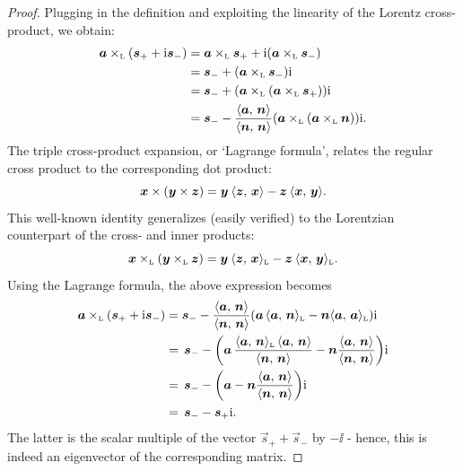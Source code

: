 \begin{proof}
    Plugging in the definition and exploiting the linearity of the Lorentz cross-product, we obtain:
    \begin{equation*}
        \begin{split}
            \lorcrossp{\vec{a}}{\qty(\vec{s}_+ + \ii\vec{s}_-)} 
            &= \lorcrossp{\vec{a}}{\vec{s}_+} +
        \ii\qty(\lorcrossp{\vec{a}}{\vec{s}_-}) \\
            &= \vec{s}_- + \qty(\lorcrossp{\vec{a}}{\vec{s}_-})\ii \\ 
            &=\vec{s}_- +  \qty(\lorcrossp{\vec{a}}{\qty(\lorcrossp{\vec{a}}{\vec{s}_+})})\ii \\
            &=\vec{s}_- -  \frac{ \inner{\vec{a}}{\vec{n}}}{ \inner{\vec{n}}{\vec{n}} }\qty(\lorcrossp{\vec{a}}{\qty(\lorcrossp{\vec{a}}{\vec{n}})})\ii.  \\
        \end{split}
    \end{equation*}
The triple cross-product expansion, or `Lagrange formula', relates the regular cross product to the corresponding dot product:
    $$ \vec{x}\times\qty(\vec{y}\times\vec{z}) = \vec{y}\:\inner{\vec{z}}{\vec{x}} - \vec{z}\:\inner{\vec{x}}{\vec{y}}. $$
This well-known identity generalizes (easily verified) to the Lorentzian counterpart of the cross- and inner products:
$$ 
    \lorcrossp{\vec{x}}{\qty(\lorcrossp{\vec{y}}{\vec{z}})} 
   = \vec{y}\:\lorinner{\vec{z}}{\vec{x}} - \vec{z}\:\lorinner{\vec{x}}{\vec{y}}. 
$$
Using the Lagrange formula, the above expression becomes
    \begin{equation*}
        \begin{split}
            \lorcrossp{\vec{a}}{\qty(\vec{s}_+ + \ii\vec{s}_-)} &= 
                \vec{s}_- - \frac{ \inner{\vec{a}}{\vec{n}} }{ \inner{\vec{n}}{\vec{n}} }\qty(\vec{a}\,\lorinner{\vec{a}}{\vec{n}} - \vec{n}\lorinner{\vec{a}}{\vec{a}})\ii \\
                & =\, \vec{s}_- - \qty(\vec{a}\,\frac{ \lorinner{\vec{a}}{\vec{n}} \, \inner{\vec{a}}{\vec{n}} }{ \inner{\vec{n}}{\vec{n}} } - \vec{n}\frac{ \inner{\vec{a}}{\vec{n}} }{ \inner{\vec{n}}{\vec{n}} })\ii \\
                & =\, \vec{s}_- - \qty(\vec{a} - \vec{n}\frac{ \inner{\vec{a}}{\vec{n}} }{ \inner{\vec{n}}{\vec{n}} })\ii \\
                & =\, \vec{s}_- - \vec{s}_+\ii. 
        \end{split}
    \end{equation*}
    The latter is the scalar multiple of the vector $\vec{s}_+ + \vec{s}_-$ by $-\ii$ - hence, this is indeed an eigenvector of the corresponding matrix.
\end{proof}


